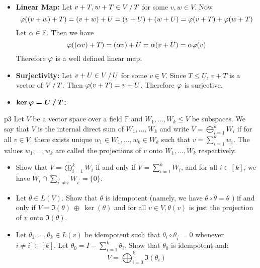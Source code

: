 \documentclass[a4paper, 11pt]{article}
\begin{document}
{\begin{enumerate}[label=(\alph*)]
\begin{itemize}
	\item \textbf{Linear Map:} Let $v+T,w+T\in\quotient{V}{T}$ for some $v,w\in V$. Now $$\varphi((v+w)+T)=(v+w)+U=(v+U)+(w+U)=\varphi(v+T)+\varphi(w+T)$$Let $\alpha\in\mathbb{F}$. Then we have $$\varphi((\alpha v)+T)=(\alpha v)+U=\alpha(v+U)=\alpha \varphi(v)$$Therefore $\varphi$ is a well defined linear map.
	\item \textbf{Surjectivity:} Let $v+U\in \quotient{V}{U}$ for some $v\in V$. Since $T\leq U$, $v+T$ is  a vector of $\quotient{V}{T}$. Then $\varphi(v+T)=v+U$. Therefore $\varphi$ is surjective.
	\item $\boldsymbol{\ker\vph=\quotient{U}{T}}$\textbf{:} 
\end{itemize}
\end{enumerate}
}


\begin{problem}{%
	}{p3%
	}
Let $V$ be a vector space over a field $\mathbb{F}$ and $W_1, \ldots, W_k \leq V$ be subspaces. We say that $V$ is the internal direct sum of $W_1, \ldots, W_k$ and write $V=\bigoplus\limits_{i=1}^k W_i$ if for all $v \in V$, there exists unique $w_1 \in W_1, \ldots, w_k \in W_k$ such that $v=\sum\limits_{i=1}^k w_i$. The values $w_1, \ldots, w_k$ are called the projections of $v$ onto $W_1, \ldots, W_k$ respectively.\begin{itemize}
	\item Show that $V=\bigoplus\limits_{i=1}^k W_i$ if and only if $V=\sum\limits_{i=1}^k W_i$, and for all $i \in[k]$, we have $W_i \cap \sum\limits_{i^{\prime} \neq i} W_{i^{\prime}}=\{0\}$.
	\item Let $\theta \in L(V)$. Show that $\theta$ is idempotent (namely, we have $\theta \circ \theta=\theta$ ) if and only if $V=\Im(\theta) \ \oplus \ \ker(\theta)$ and for all $v \in V, \theta(v)$ is just the projection of $v$ onto $\Im(\theta)$.
	\item Let $\theta_1, \ldots, \theta_k \in L(v)$ be idempotent such that $\theta_i \circ \theta_{i^{\prime}}=0$ whenever $i \neq i^{\prime} \in[k]$. Let $\theta_0=I-\sum\limits_{i=1}^k \theta_i$. Show that $\theta_0$ is idempotent and:
	$$
	V=\bigoplus_{i=0}^k \Im\left(\theta_i\right)
	$$
\end{itemize}

\end{problem}
\solve{
}
\end{document}

